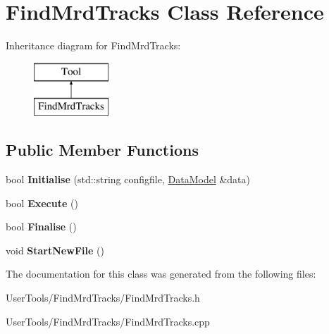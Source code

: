 \hypertarget{classFindMrdTracks}{\section{Find\-Mrd\-Tracks Class Reference}
\label{classFindMrdTracks}
}
Inheritance diagram for Find\-Mrd\-Tracks\-:\begin{figure}[H]
\begin{center}
\leavevmode
\includegraphics[height=2.000000cm]{classFindMrdTracks}
\end{center}
\end{figure}
\subsection*{Public Member Functions}
\begin{DoxyCompactItemize}
\item 
\hypertarget{classFindMrdTracks_a32cc40daea77e8fc6d4f64791922696e}{bool {\bfseries Initialise} (std\-::string configfile, \hyperlink{classDataModel}{Data\-Model} \&data)}\label{classFindMrdTracks_a32cc40daea77e8fc6d4f64791922696e}

\item 
\hypertarget{classFindMrdTracks_a24260dbeaee440f91c5aaad0af93886c}{bool {\bfseries Execute} ()}\label{classFindMrdTracks_a24260dbeaee440f91c5aaad0af93886c}

\item 
\hypertarget{classFindMrdTracks_a4c03c3790e73938bc9786981de31bab4}{bool {\bfseries Finalise} ()}\label{classFindMrdTracks_a4c03c3790e73938bc9786981de31bab4}

\item 
\hypertarget{classFindMrdTracks_acdbbb5dc3f26dcbc527d08483b2bcc9e}{void {\bfseries Start\-New\-File} ()}\label{classFindMrdTracks_acdbbb5dc3f26dcbc527d08483b2bcc9e}

\end{DoxyCompactItemize}


The documentation for this class was generated from the following files\-:\begin{DoxyCompactItemize}
\item 
User\-Tools/\-Find\-Mrd\-Tracks/Find\-Mrd\-Tracks.\-h\item 
User\-Tools/\-Find\-Mrd\-Tracks/Find\-Mrd\-Tracks.\-cpp\end{DoxyCompactItemize}
